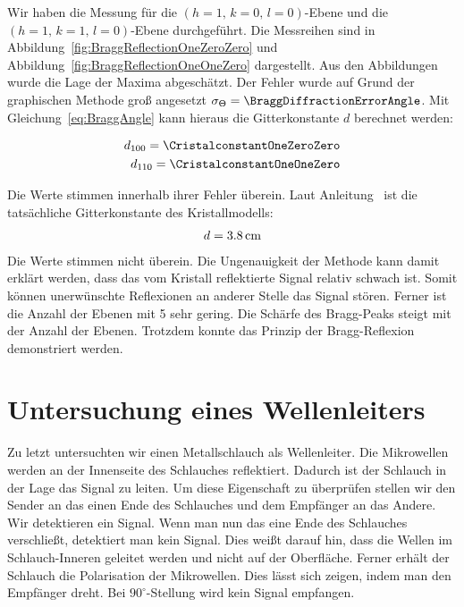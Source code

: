 \documentclass[a4paper,10pt,twocolumn]{article}
\begin{document}
    Wir haben die Messung für die $(h=1,\,k=0,\,l=0)$-Ebene und die $(h=1,\,k=1,\,l=0)$-Ebene durchgeführt.
    Die Messreihen sind in Abbildung~\ref{fig:BraggReflectionOneZeroZero} und Abbildung~\ref{fig:BraggReflectionOneOneZero}
    dargestellt.
    Aus den Abbildungen wurde die Lage der Maxima abgeschätzt.
    Der Fehler wurde auf Grund der graphischen Methode groß angesetzt $\sigma_{\Theta} = \BraggDiffractionErrorAngle$.
    Mit Gleichung~\eqref{eq:BraggAngle} kann hieraus die Gitterkonstante $d$ berechnet werden:
    
    \begin{align*}
        d_{100} = \CristalconstantOneZeroZero \\
        d_{110} = \CristalconstantOneOneZero
    \end{align*}
    
    Die Werte stimmen innerhalb ihrer Fehler überein.
    Laut Anleitung~\cite{pascoTeachersGuide} ist die tatsächliche Gitterkonstante des Kristallmodells:
    \begin{align*}
        d = 3.8 \, \mathrm{cm}
    \end{align*}
    Die Werte stimmen nicht überein.
    Die Ungenauigkeit der Methode kann damit erklärt werden, dass das vom Kristall reflektierte Signal
    relativ schwach ist.
    Somit können unerwünschte Reflexionen an anderer Stelle das Signal stören.
    Ferner ist die Anzahl der Ebenen mit 5 sehr gering.
    Die Schärfe des Bragg-Peaks steigt mit der Anzahl der Ebenen.
    Trotzdem konnte das Prinzip der Bragg-Reflexion demonstriert werden.
    
    \section{Untersuchung eines Wellenleiters}
    
    
    Zu letzt untersuchten wir einen Metallschlauch als Wellenleiter.
    Die Mikrowellen werden an der Innenseite des Schlauches reflektiert.
    Dadurch ist der Schlauch in der Lage das Signal zu leiten.
    Um diese Eigenschaft zu überprüfen stellen wir den Sender an das einen Ende des Schlauches
    und dem Empfänger an das Andere.
    Wir detektieren ein Signal.
    Wenn man nun das eine Ende des Schlauches verschließt, detektiert man kein Signal.
    Dies weißt darauf hin, dass die Wellen im Schlauch-Inneren geleitet werden und nicht auf der Oberfläche.
    Ferner erhält der Schlauch die Polarisation der Mikrowellen.
    Dies lässt sich zeigen, indem man den Empfänger dreht.
    Bei $90^{\circ}$-Stellung wird kein Signal empfangen.
\end{document}
